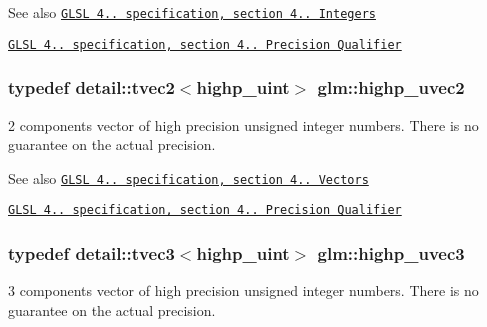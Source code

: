 \begin{DoxySeeAlso}{\-See also}
\href{http://www.opengl.org/registry/doc/GLSLangSpec.4.20.8.pdf}{\tt \-G\-L\-S\-L 4.. specification, section 4.. \-Integers} 

\href{http://www.opengl.org/registry/doc/GLSLangSpec.4.20.8.pdf}{\tt \-G\-L\-S\-L 4.. specification, section 4.. \-Precision \-Qualifier} 
\end{DoxySeeAlso}
\hypertarget{group__core__precision_ga1c56d043a20a6db84fc3d18b227875fb}{
\subsubsection[{highp\-\_\-uvec2}]{\setlength{\rightskip}{0pt plus 5cm}typedef detail\-::tvec2$<$highp\-\_\-uint$>$ {\bf glm\-::highp\-\_\-uvec2}}}\label{group__core__precision_ga1c56d043a20a6db84fc3d18b227875fb}
2 components vector of high precision unsigned integer numbers. \-There is no guarantee on the actual precision.

\begin{DoxySeeAlso}{\-See also}
\href{http://www.opengl.org/registry/doc/GLSLangSpec.4.20.8.pdf}{\tt \-G\-L\-S\-L 4.. specification, section 4.. \-Vectors} 

\href{http://www.opengl.org/registry/doc/GLSLangSpec.4.20.8.pdf}{\tt \-G\-L\-S\-L 4.. specification, section 4.. \-Precision \-Qualifier} 
\end{DoxySeeAlso}
\hypertarget{group__core__precision_gade4b43d968dd42ee3215a51de7b86425}{
\subsubsection[{highp\-\_\-uvec3}]{\setlength{\rightskip}{0pt plus 5cm}typedef detail\-::tvec3$<$highp\-\_\-uint$>$ {\bf glm\-::highp\-\_\-uvec3}}}\label{group__core__precision_gade4b43d968dd42ee3215a51de7b86425}
3 components vector of high precision unsigned integer numbers. \-There is no guarantee on the actual precision.

